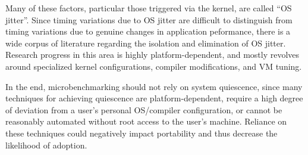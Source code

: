 \documentclass[conference]{IEEEtran}
\begin{document}
Many of these factors, particular those triggered via the kernel, are called ``OS jitter''.
Since timing variations due to OS jitter are difficult to distinguish from timing variations
due to genuine changes in application peformance, there is a wide corpus of literature
regarding the isolation and elimination of OS jitter. Research progress in this area is
highly platform-dependent, and mostly revolves around specialized kernel configurations,
compiler modifications, and VM tuning.

In the end, microbenchmarking should not rely on system quiescence, since many techniques
for achieving quiescence are platform-dependent, require a high degree of deviation from
a user's personal OS/compiler configuration, or cannot be reasonably automated without
root access to the user's machine. Reliance on these techniques could negatively impact
portability and thus decrease the likelihood of adoption.
\end{document}
